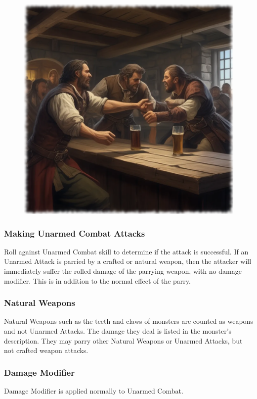 \begin{figure}[H]
\begin{center}
\includegraphics[scale=0.24]{img/ai-images/tavern-brawl.png}
\end{center}
\end{figure}

\subsubsection{Making Unarmed Combat Attacks}
Roll against Unarmed Combat skill to determine if the attack is successful. If an Unarmed Attack is parried by a crafted or natural weapon, then the attacker will immediately suffer the rolled damage of the parrying weapon, with no damage modifier. This is in addition to the normal effect of the parry. 

\subsubsection{Natural Weapons}
Natural Weapons such as the teeth and claws of monsters are counted as weapons and not Unarmed Attacks. The damage they deal is listed in the monster’s description. They may parry other Natural Weapons or Unarmed Attacks, but not crafted weapon attacks.

\subsubsection{Damage Modifier}
Damage Modifier is applied normally to Unarmed Combat.

